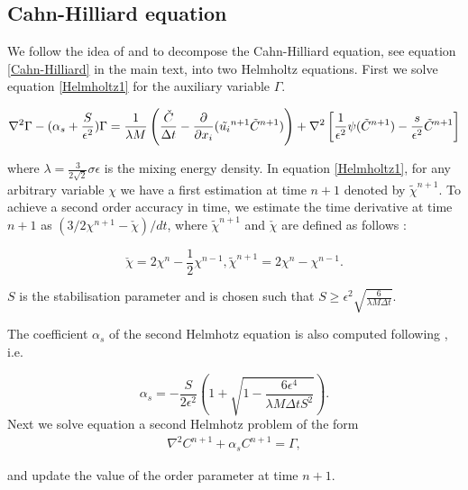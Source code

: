 \documentclass[review]{elsarticle}
\begin{document}
\subsection{Cahn-Hilliard equation}
We follow the idea of  \cite{YUE}  and \cite{DONG2012} to decompose the Cahn-Hilliard equation, see equation \ref{Cahn-Hilliard} in the main text, into two Helmholtz equations. First we solve equation \ref{Helmholtz1} for the auxiliary variable $\Gamma$. 
\begin{linenomath}\begin{equation} \label{Helmholtz1}
 \nabla^2 \Gamma -(\alpha_s + \frac{S}{\epsilon^2})\Gamma = \frac{1}{\lambda M}\left(\frac{\check C}{\Delta t} \\
-\frac{\partial}{\partial x_i}(\tilde{u_i}^{n+1} \tilde{C}^{n+1}) \right)+ \nabla^2 \left[\frac{1}{\epsilon^2}  \psi(\tilde{C}^{n+1})-\frac{s}{\epsilon^2}\tilde{C}^{n+1} \right]
\end{equation}\end{linenomath}
where $\lambda= \frac{3}{2\sqrt{2}}\sigma \epsilon$ is the mixing energy density. In equation \ref{Helmholtz1}, for any arbitrary variable $\chi$ we have a first estimation at time $n+1$ denoted  by $\tilde{\chi}^{n+1}$.  To achieve a second order accuracy in time, we estimate the time derivative at time $n+1$ as $(3/2\chi^{n+1}-\check{\chi})/dt$, where     $\tilde{\chi}^{n+1}$ and $\check{\chi}$ are defined as follows \citep{DONG2012}:
\begin{linenomath}\begin{equation}
\check{\chi} = 2\chi^n-\frac{1}{2}\chi^{n-1}, \tilde{\chi}^{n+1} =  2\chi^n-\chi^{n-1}.
\end{equation}\end{linenomath}
$S$ is the stabilisation parameter and is chosen such that $S\geq \epsilon^2 \sqrt{\frac{6}{\lambda M \Delta t}}$. 

The coefficient $\alpha_s$ of the second Helmhotz equation is also computed following \cite{DONG2012}, i.e.\
\begin{linenomath}\begin{equation}
\alpha_s = -\frac{S}{2\epsilon^2}\left( 1+\sqrt{1-\frac{6\epsilon^4}{\lambda M \Delta t S^2}}\right).
\end{equation}
Next we solve equation a second Helmhotz problem of the form 
\begin{equation} \label{Helmholtz2}
\begin{gathered}
 \nabla^2 C^{n+1} + \alpha_s C^{n+1} = \Gamma,
 \end{gathered}
\end{equation}\end{linenomath}
and update the value of the order parameter at time $n+1$.
\end{document}
